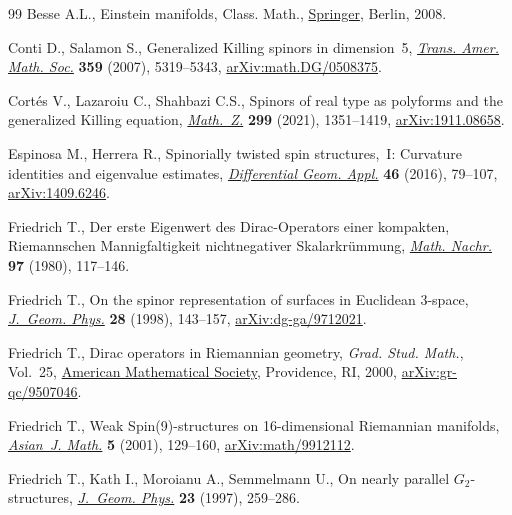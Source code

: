 \documentclass[pdftex]{sigma}
\numberwithin{equation}{section}
\begin{document}
\begin{thebibliography}{99}
Besse A.L., Einstein manifolds, Class. Math., \href{https://doi.org/10.1007/978-3-540-74311-8}{Springer}, Berlin, 2008.

Conti D., Salamon S., Generalized {K}illing spinors in dimension~5,
 \href{https://doi.org/10.1090/S0002-9947-07-04307-3}{\textit{Trans. Amer. Math. Soc.}} \textbf{359} (2007), 5319--5343,
 \href{https://arxiv.org/abs/math.DG/0508375}{arXiv:math.DG/0508375}.

Cort\'es V., Lazaroiu C., Shahbazi C.S., Spinors of real type as polyforms and
 the generalized {K}illing equation, \href{https://doi.org/10.1007/s00209-021-02726-6}{\textit{Math.~Z.}} \textbf{299} (2021),
 1351--1419, \href{https://arxiv.org/abs/1911.08658}{arXiv:1911.08658}.

Espinosa M., Herrera R., Spinorially twisted spin structures,~{I}: {C}urvature
 identities and eigenvalue estimates, \href{https://doi.org/10.1016/j.difgeo.2016.01.008}{\textit{Differential Geom. Appl.}}
 \textbf{46} (2016), 79--107, \href{https://arxiv.org/abs/1409.6246}{arXiv:1409.6246}.

Friedrich T., Der erste {E}igenwert des {D}irac-{O}perators einer kompakten,
 {R}iemannschen {M}annigfaltigkeit nichtnegativer {S}kalarkr\"ummung,
 \href{https://doi.org/10.1002/mana.19800970111}{\textit{Math. Nachr.}} \textbf{97} (1980), 117--146.

Friedrich T., On the spinor representation of surfaces in {E}uclidean
 {$3$}-space, \href{https://doi.org/10.1016/S0393-0440(98)00018-7}{\textit{J.~Geom. Phys.}} \textbf{28} (1998), 143--157,
 \href{https://arxiv.org/abs/dg-ga/9712021}{arXiv:dg-ga/9712021}.

Friedrich T., Dirac operators in {R}iemannian geometry, \textit{Grad. Stud.
 Math.}, Vol.~25, \href{https://doi.org/10.1090/gsm/025}{American Mathematical Society}, Providence, RI, 2000,
 \href{https://arxiv.org/abs/gr-qc/9507046}{arXiv:gr-qc/9507046}.

Friedrich T., Weak {S}pin(9)-structures on 16-dimensional {R}iemannian
 manifolds, \href{https://doi.org/10.4310/AJM.2001.v5.n1.a9}{\textit{Asian~J. Math.}} \textbf{5} (2001), 129--160,
 \href{https://arxiv.org/abs/math/9912112}{arXiv:math/9912112}.

Friedrich T., Kath I., Moroianu A., Semmelmann U., On nearly parallel
 {$G_2$}-structures, \href{https://doi.org/10.1016/S0393-0440(97)80004-6}{\textit{J.~Geom. Phys.}} \textbf{23} (1997), 259--286.


\end{thebibliography}
\end{document}
